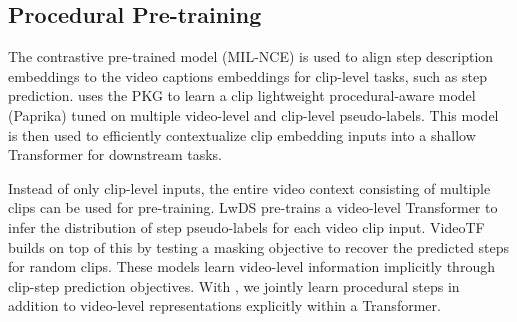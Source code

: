 \subsection{Procedural Pre-training}
The contrastive pre-trained model (MIL-NCE) \cite{miech19howto100m} is used to align step description embeddings to the video captions embeddings for clip-level tasks, such as step prediction. \cite{paprika} uses the PKG to learn a clip lightweight procedural-aware model (Paprika) tuned on multiple video-level and clip-level pseudo-labels. This model is then used to efficiently contextualize clip embedding inputs into a shallow Transformer \citep{vaswani2017attention} for downstream tasks. 

Instead of only clip-level inputs, the entire video context consisting of multiple clips can be used for pre-training. LwDS pre-trains a video-level Transformer to infer the distribution of step pseudo-labels for each video clip input. VideoTF builds on top of this by testing a masking objective to recover the predicted steps for random clips. These models learn video-level information implicitly through clip-step prediction objectives. With \model, we jointly learn procedural steps in addition to video-level representations explicitly within a Transformer.
